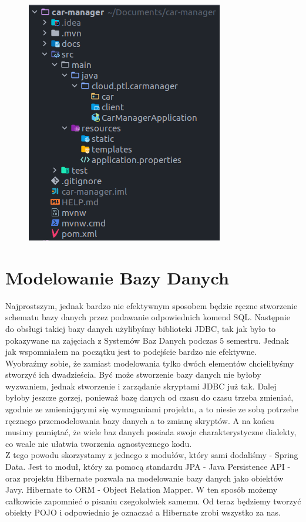 \documentclass{article}
\begin{document}
        \begin{figure}[h]
            \centering
            \includegraphics{tree.png}
        \end{figure}
    
    \section{Modelowanie Bazy Danych}
        Najprostszym, jednak bardzo nie efektywnym sposobem będzie ręczne stworzenie schematu bazy danych przez podawanie odpowiednich komend SQL. Następnie do obsługi takiej bazy danych użylibyśmy biblioteki JDBC, tak jak było to pokazywane na zajęciach z Systemów Baz Danych podczas 5 semestru. Jednak jak wspomniałem na początku jest to podejście bardzo nie efektywne. Wyobraźmy sobie, że zamiast modelowania tylko dwóch elementów chcielibyśmy stworzyć ich dwadzieścia. Być może stworzenie bazy danych nie byłoby wyzwaniem, jednak stworzenie i zarządanie skryptami JDBC już tak. Dalej byłoby jeszcze gorzej, ponieważ bazę danych od czasu do czasu trzeba zmieniać, zgodnie ze zmieniającymi się wymaganiami projektu, a to niesie ze sobą potrzebe ręcznego przemodelowania bazy danych a to zmianę skryptów. A na końcu musimy pamiętać, że wiele baz danych posiada swoje charakterystyczne dialekty, co wcale nie ułatwia tworzenia agnostycznego kodu. \\
        Z tego powodu skorzystamy z jednego z modułów, który sami dodaliśmy - Spring Data. Jest to moduł, który za pomocą standardu JPA - Java Persistence API - oraz projektu Hibernate pozwala na modelowanie bazy danych jako obiektów Javy. Hibernate to ORM - Object Relation Mapper. W ten sposób możemy całkowicie zapomnieć o pisaniu czegokolwiek samemu. Od teraz będziemy tworzyć obiekty POJO i odpowiednio je oznaczać a Hibernate zrobi wszystko za nas.
        
\end{document}
